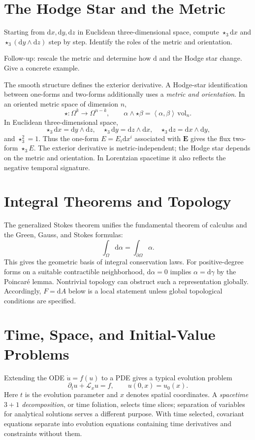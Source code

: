 \documentclass[11pt,openany]{book}
\numberwithin{equation}{chapter}
\theoremstyle{definition}
\theoremstyle{remark}
\newcommand{\dd}{\mathrm d}
\newcommand{\vol}{\mathrm{vol}}
\newcommand{\starS}{\star_3}
\newcommand{\ip}[2]{\left\langle #1,#2\right\rangle}
\begin{document}
\section{The Hodge Star and the Metric}
\begin{askai}
Starting from $\dd x,\dd y,\dd z$ in Euclidean three-dimensional space, compute $\starS\dd x$ and $\starS(\dd y\wedge\dd z)$ step by step. Identify the roles of the metric and orientation.

Follow-up: rescale the metric and determine how $\dd$ and the Hodge star change. Give a concrete example.
\end{askai}
The smooth structure defines the exterior derivative. A Hodge-star identification between one-forms and two-forms additionally uses a \emph{metric and orientation}. In an oriented metric space of dimension $n$,
\begin{equation}
\star:\Omega^k\to\Omega^{n-k},\qquad
\alpha\wedge\star\beta=\ip{\alpha}{\beta}\,\vol_n.
\end{equation}
In Euclidean three-dimensional space,
\begin{equation}
\starS\dd x=\dd y\wedge\dd z,\quad
\starS\dd y=\dd z\wedge\dd x,\quad
\starS\dd z=\dd x\wedge\dd y,
\end{equation}
and $\starS^2=1$. Thus the one-form $E=E_i\dd x^i$ associated with $\bm E$ gives the flux two-form $\starS E$. The exterior derivative is metric-independent; the Hodge star depends on the metric and orientation. In Lorentzian spacetime it also reflects the negative temporal signature.

\section{Integral Theorems and Topology}
The generalized Stokes theorem unifies the fundamental theorem of calculus and the Green, Gauss, and Stokes formulas:
\begin{equation}\label{eq:stokes}
\int_\Omega\dd\alpha=\int_{\partial\Omega}\alpha.
\end{equation}
This gives the geometric basis of integral conservation laws. For positive-degree forms on a suitable contractible neighborhood, $\dd\alpha=0$ implies $\alpha=\dd\gamma$ by the Poincar\'e lemma. Nontrivial topology can obstruct such a representation globally. Accordingly, $F=\dd A$ below is a local statement unless global topological conditions are specified.

\section{Time, Space, and Initial-Value Problems}
Extending the ODE $\dot u=f(u)$ to a PDE gives a typical evolution problem
\begin{equation}
\partial_t u+\mathcal L_xu=f,\qquad u(0,x)=u_0(x).
\end{equation}
Here $t$ is the evolution parameter and $x$ denotes spatial coordinates. A \emph{spacetime $3+1$ decomposition}, or time foliation, selects time slices; separation of variables for analytical solutions serves a different purpose. With time selected, covariant equations separate into evolution equations containing time derivatives and constraints without them.
\end{document}
